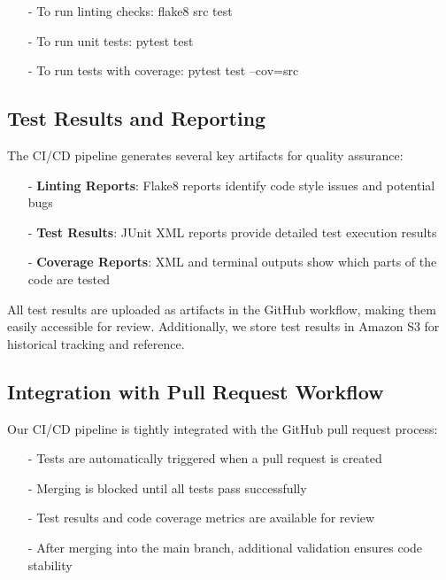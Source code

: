\documentclass[12pt, titlepage]{article}
\begin{document}
\begin{itemize}
    \item[-] To run linting checks: flake8 src test
    \item[-] To run unit tests: pytest test
    \item[-] To run tests with coverage: pytest test --cov=src
\end{itemize}

\subsection{Test Results and Reporting}

The CI/CD pipeline generates several key artifacts for quality assurance:

\begin{itemize}
    \item[-] \textbf{Linting Reports}: Flake8 reports identify code style issues and potential bugs
    \item[-] \textbf{Test Results}: JUnit XML reports provide detailed test execution results
    \item[-] \textbf{Coverage Reports}: XML and terminal outputs show which parts of the code are tested
\end{itemize}

\noindent All test results are uploaded as artifacts in the GitHub workflow, making them easily accessible for review. Additionally, we store test results in Amazon S3 for historical tracking and reference.

\subsection{Integration with Pull Request Workflow}

Our CI/CD pipeline is tightly integrated with the GitHub pull request process:

\begin{itemize}
    \item[-] Tests are automatically triggered when a pull request is created
    \item[-] Merging is blocked until all tests pass successfully
    \item[-] Test results and code coverage metrics are available for review
    \item[-] After merging into the main branch, additional validation ensures code stability
\end{itemize}
\end{document}
